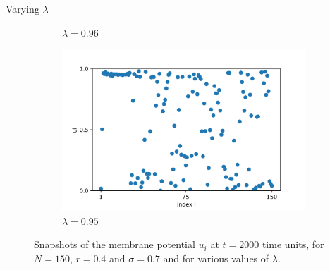 \documentclass{beamer}
\begin{document}
\begin{frame}{Varying $\lambda$}
\begin{figure}[H]
\begin{subfigure}{.32\textwidth}
  \caption{$\lambda=0.96$}
\end{subfigure}
\hfill
\begin{subfigure}{.32\textwidth}
  \centering
  \includegraphics[width=1\linewidth]{u_lambda=0.95_t=2000.png}  
  \caption{$\lambda=0.95$}
\end{subfigure}

\caption{Snapshots of the membrane potential $u_i$ at $t=2000$ time units, for $N=150$, $r=0.4$ and $\sigma = 0.7$ and for various values of $\lambda$.}
\label{uivslmd}
\end{figure}

\end{frame}
\end{document}
